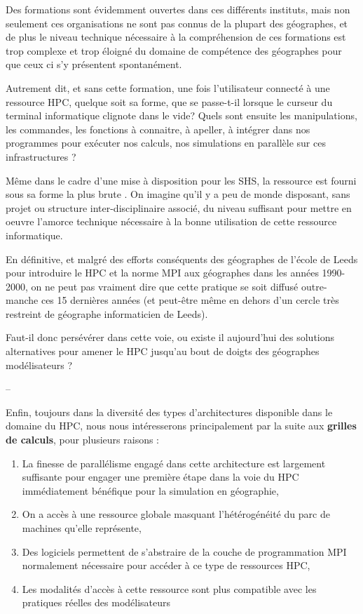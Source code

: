 Des formations sont évidemment ouvertes dans ces différents instituts, mais non seulement ces organisations ne sont pas connus de la plupart des géographes, et de plus le niveau technique nécessaire à la compréhension de ces formations est trop complexe et trop éloigné du domaine de compétence des géographes pour que ceux ci s'y présentent spontanément.

Autrement dit, et sans cette formation, une fois l'utilisateur connecté à une ressource HPC, quelque soit sa forme, que se passe-t-il lorsque le curseur du terminal informatique clignote dans le vide? Quels sont ensuite les manipulations, les commandes, les fonctions à connaitre, à apeller, à intégrer dans nos programmes pour exécuter nos calculs, nos simulations en parallèle sur ces infrastructures ?

Même dans le cadre d'une mise à disposition pour les SHS, la ressource est fourni sous sa forme la plus brute . On imagine qu'il y a peu de monde disposant, sans projet ou structure inter-disciplinaire associé, du niveau suffisant pour mettre en oeuvre l'amorce technique nécessaire à la bonne utilisation de cette ressource informatique.

En définitive, et malgré des efforts conséquents des géographes de l'école de Leeds \autocite{Openshaw2000} pour introduire le HPC et la norme MPI aux géographes dans les années 1990-2000, on ne peut pas vraiment dire que cette pratique se soit diffusé outre-manche ces 15 dernières années (et peut-être même en dehors d'un cercle très restreint de géographe informaticien de Leeds). 

Faut-il donc persévérer dans cette voie, ou existe il aujourd'hui des solutions alternatives pour amener le HPC jusqu'au bout de doigts des géographes modélisateurs ? 

--


Enfin, toujours dans la diversité des types d'architectures disponible dans le domaine du HPC, nous nous intéresserons principalement par la suite aux \textbf{grilles de calculs}, pour plusieurs raisons :

\begin{enumerate}[label=(\alph*),labelindent=\parindent,leftmargin=*]
\item La finesse de parallélisme engagé dans cette architecture est largement suffisante pour engager une première étape dans la voie du HPC immédiatement bénéfique pour la simulation en géographie,
\item On a accès à une ressource globale masquant l'hétérogénéité du parc de machines qu'elle représente, 
\item Des logiciels permettent de s'abstraire de la couche de programmation MPI normalement nécessaire pour accéder à ce type de ressources HPC,
\item Les modalités d'accès à cette ressource sont plus compatible avec les pratiques réelles des modélisateurs
\end{enumerate}


